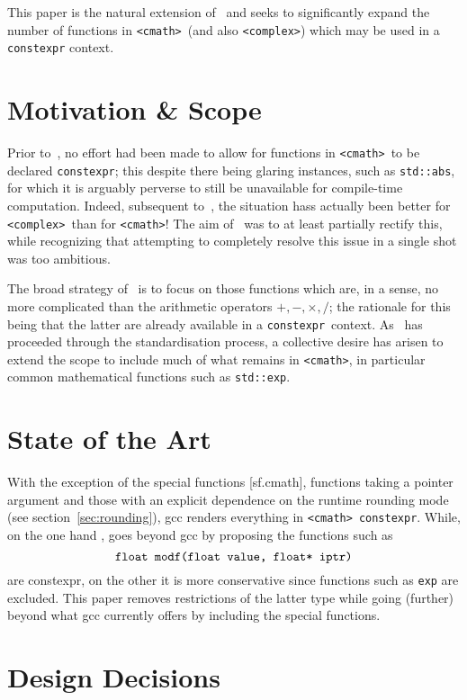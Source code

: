 \documentclass[prd,twocolumn,amsmath,amssymb,nofootinbib,eqsecnum]{revtex4-1}
\newcommand{\constexpr}{\code{constexpr}\xspace}
\newcommand{\code}[1]{{\tt #1}}
\newcommand{\header}[1]{{\tt <#1>}}
\newcommand{\cmath}{\header{cmath}}
\newcommand{\complex}{\header{complex}}
\newcommand{\Operators}{\ensuremath{+,-,\times,/}}
\begin{document}
This paper is the natural extension of~\cite{Rosten-constexpr} and seeks to significantly expand the number of functions in \cmath\ (and also \complex) which may be used in a \constexpr context. 


\section{Motivation \& Scope}

Prior to~\cite{Rosten-constexpr}, no effort had been made to allow for functions in \cmath\ to be declared \constexpr; this despite there being glaring instances, such as \code{std::abs}, for which it is arguably perverse to still be unavailable for compile-time computation. Indeed, subsequent to~\cite{AP-complex}, the situation hass actually been better for \complex\ than for \cmath! The aim of~\cite{Rosten-constexpr} was to at least partially rectify this, while recognizing that attempting to completely resolve this issue in a single shot was too ambitious.

The broad strategy of~\cite{Rosten-constexpr} is to focus on those functions which are, in a sense, no more complicated than the arithmetic operators \Operators; the rationale for this being that the latter are already available in a \constexpr\ context.
As~\cite{Rosten-constexpr} has proceeded through the standardisation process, a collective desire has arisen to extend the scope to include much of what remains in \cmath, in particular common mathematical functions such as \code{std::exp}.


\section{State of the Art}

With the exception of the special functions [sf.cmath], functions taking a pointer argument and those with an explicit dependence on the runtime rounding mode (see section~\ref{sec:rounding}), gcc renders everything in \cmath\ \constexpr. While, on the one hand \cite{Rosten-constexpr}, goes beyond gcc by proposing the functions such as
\[
	\mbox{\code{float modf(float value, float* iptr)}}
\]
are constexpr, on the other it is more conservative since functions such as \code{exp} are excluded. This paper removes restrictions of the latter type while going (further) beyond what gcc currently offers by including the special functions.

\section{Design Decisions}
\end{document}
